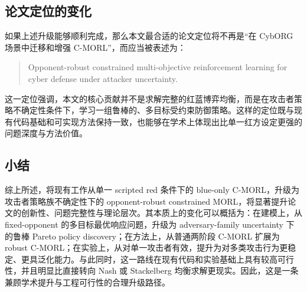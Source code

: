\documentclass[12pt,a4paper]{article}
\begin{document}
\subsection{论文定位的变化}

如果上述升级能够顺利完成，那么本文最合适的论文定位将不再是“在 CybORG 场景中迁移和增强 C-MORL”，而应当被表述为：
\begin{quote}
Opponent-robust constrained multi-objective reinforcement learning for cyber defense under attacker uncertainty.
\end{quote}

这一定位强调，本文的核心贡献并不是求解完整的红蓝博弈均衡，而是在攻击者策略不确定性条件下，学习一组鲁棒的、多目标受约束防御策略。这样的定位既与现有代码基础和可实现方法保持一致，也能够在学术上体现出比单一红方设定更强的问题深度与方法价值。

\subsection{小结}

综上所述，将现有工作从单一 scripted red 条件下的 blue-only C-MORL，升级为攻击者策略族不确定性下的 opponent-robust constrained MORL，将显著提升论文的创新性、问题完整性与理论层次。其本质上的变化可以概括为：在建模上，从 fixed-opponent 的多目标最优响应问题，升级为 adversary-family uncertainty 下的鲁棒 Pareto policy discovery；在方法上，从普通两阶段 C-MORL 扩展为 robust C-MORL；在实验上，从对单一攻击者有效，提升为对多类攻击行为更稳定、更具泛化能力。与此同时，这一路线在现有代码和实验基础上具有较高可行性，并且明显比直接转向 Nash 或 Stackelberg 均衡求解更现实。因此，这是一条兼顾学术提升与工程可行性的合理升级路径。
\end{document}

